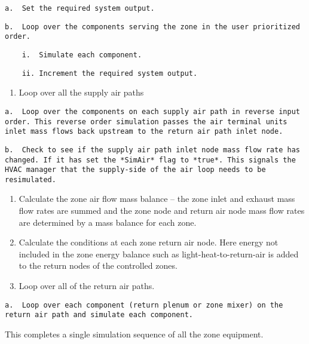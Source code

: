 \begin{lstlisting}
a.  Set the required system output.
\end{lstlisting}

\begin{lstlisting}
b.  Loop over the components serving the zone in the user prioritized order.
\end{lstlisting}

\begin{lstlisting}
    i.  Simulate each component.
\end{lstlisting}

\begin{lstlisting}
    ii. Increment the required system output.
\end{lstlisting}

\begin{enumerate}
\def\labelenumi{\arabic{enumi}.}
\setcounter{enumi}{2}
\tightlist
\item
  Loop over all the supply air paths
\end{enumerate}

\begin{lstlisting}
a.  Loop over the components on each supply air path in reverse input order. This reverse order simulation passes the air terminal units inlet mass flows back upstream to the return air path inlet node.
\end{lstlisting}

\begin{lstlisting}
b.  Check to see if the supply air path inlet node mass flow rate has changed. If it has set the *SimAir* flag to *true*. This signals the HVAC manager that the supply-side of the air loop needs to be resimulated.
\end{lstlisting}

\begin{enumerate}
\def\labelenumi{\arabic{enumi}.}
\setcounter{enumi}{3}
\item
  Calculate the zone air flow mass balance -- the zone inlet and exhaust mass flow rates are summed and the zone node and return air node mass flow rates are determined by a mass balance for each zone.
\item
  Calculate the conditions at each zone return air node. Here energy not included in the zone energy balance such as light-heat-to-return-air is added to the return nodes of the controlled zones.
\item
  Loop over all of the return air paths.
\end{enumerate}

\begin{lstlisting}
a.  Loop over each component (return plenum or zone mixer) on the return air path and simulate each component.
\end{lstlisting}

This completes a single simulation sequence of all the zone equipment.
